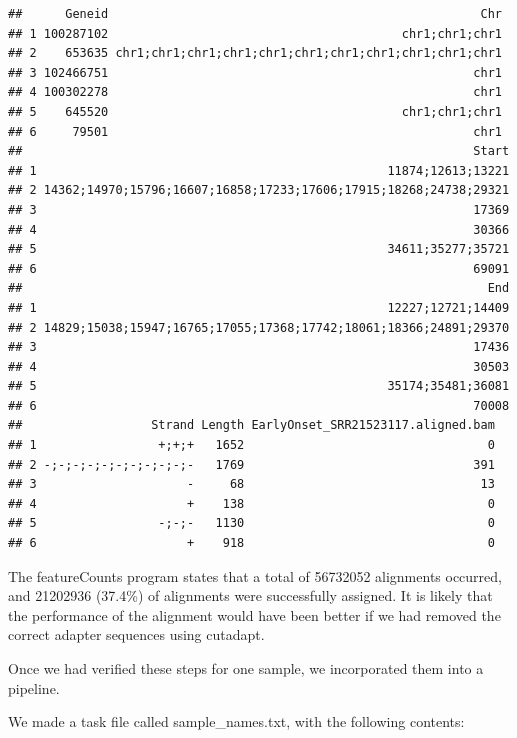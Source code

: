 \documentclass[
]{article}
\begin{document}
\begin{verbatim}
##      Geneid                                                    Chr
## 1 100287102                                         chr1;chr1;chr1
## 2    653635 chr1;chr1;chr1;chr1;chr1;chr1;chr1;chr1;chr1;chr1;chr1
## 3 102466751                                                   chr1
## 4 100302278                                                   chr1
## 5    645520                                         chr1;chr1;chr1
## 6     79501                                                   chr1
##                                                               Start
## 1                                                 11874;12613;13221
## 2 14362;14970;15796;16607;16858;17233;17606;17915;18268;24738;29321
## 3                                                             17369
## 4                                                             30366
## 5                                                 34611;35277;35721
## 6                                                             69091
##                                                                 End
## 1                                                 12227;12721;14409
## 2 14829;15038;15947;16765;17055;17368;17742;18061;18366;24891;29370
## 3                                                             17436
## 4                                                             30503
## 5                                                 35174;35481;36081
## 6                                                             70008
##                  Strand Length EarlyOnset_SRR21523117.aligned.bam
## 1                 +;+;+   1652                                  0
## 2 -;-;-;-;-;-;-;-;-;-;-   1769                                391
## 3                     -     68                                 13
## 4                     +    138                                  0
## 5                 -;-;-   1130                                  0
## 6                     +    918                                  0
\end{verbatim}

The featureCounts program states that a total of 56732052 alignments
occurred, and 21202936 (37.4\%) of alignments were successfully
assigned. It is likely that the performance of the alignment would have
been better if we had removed the correct adapter sequences using
cutadapt.

Once we had verified these steps for one sample, we incorporated them
into a pipeline.

We made a task file called sample\_names.txt, with the following
contents:
\end{document}
